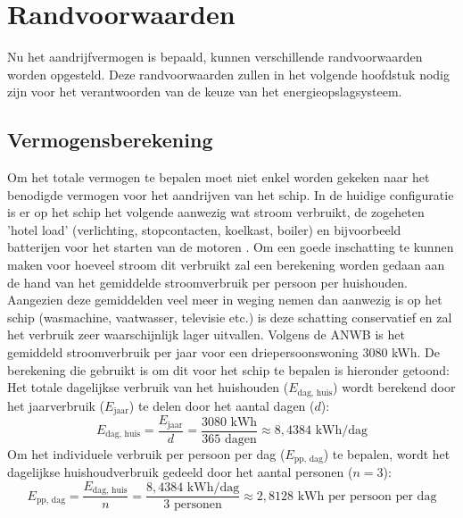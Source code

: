 \chapter{Randvoorwaarden}

\noindent Nu het aandrijfvermogen is bepaald, kunnen verschillende randvoorwaarden worden opgesteld. Deze randvoorwaarden zullen in het volgende hoofdstuk nodig zijn voor het verantwoorden van de keuze van het energieopslagsysteem.

\section*{Vermogensberekening}

\noindent Om het totale vermogen te bepalen moet niet enkel worden gekeken naar het benodigde vermogen voor het aandrijven van het schip. In de huidige configuratie is er op het schip het volgende aanwezig wat stroom verbruikt, de zogeheten 'hotel load' (verlichting, stopcontacten, koelkast, boiler) en bijvoorbeeld batterijen voor het starten van de motoren \cite{vanbaalen2026interview}. Om een goede inschatting te kunnen maken voor hoeveel stroom dit verbruikt zal een berekening worden gedaan aan de hand van het gemiddelde stroomverbruik per persoon per huishouden. Aangezien deze gemiddelden veel meer in weging nemen dan aanwezig is op het schip (wasmachine, vaatwasser, televisie etc.) is deze schatting conservatief en zal het verbruik zeer waarschijnlijk lager uitvallen. Volgens de ANWB \cite{ANWBEnergieverbruik} is het gemiddeld stroomverbruik per jaar voor een driepersoonswoning 3080 kWh. De berekening die gebruikt is om dit voor het schip te bepalen is hieronder getoond:
Het totale dagelijkse verbruik van het huishouden ($E_{\text{dag, huis}}$) wordt berekend door het jaarverbruik ($E_{\text{jaar}}$) te delen door het aantal dagen ($d$):
\begin{equation}
E_{\text{dag, huis}} = \frac{E_{\text{jaar}}}{d} = \frac{3080 \text{ kWh}}{365 \text{ dagen}} \approx 8{,}4384 \text{ kWh/dag}
\end{equation}
Om het individuele verbruik per persoon per dag ($E_{\text{pp, dag}}$) te bepalen, wordt het dagelijkse huishoudverbruik gedeeld door het aantal personen ($n = 3$):
\begin{equation}
E_{\text{pp, dag}} = \frac{E_{\text{dag, huis}}}{n} = \frac{8{,}4384 \text{ kWh/dag}}{3 \text{ personen}} \approx 2{,}8128 \text{ kWh per persoon per dag}
\end{equation}


